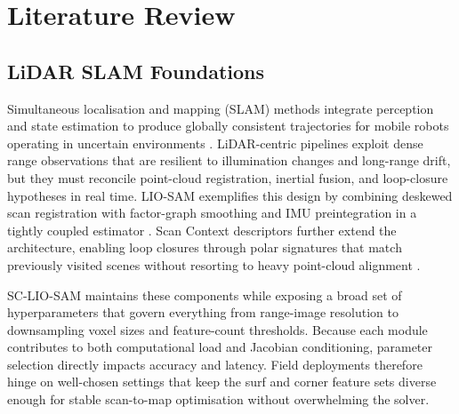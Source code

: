 \chapter[Literature Review]{Literature Review}
\label{Chap:Literature}



\section{LiDAR SLAM Foundations}
Simultaneous localisation and mapping (SLAM) methods integrate perception and state estimation to produce globally consistent trajectories for mobile robots operating in uncertain environments \cite{cadena_2016_past}. LiDAR-centric pipelines exploit dense range observations that are resilient to illumination changes and long-range drift, but they must reconcile point-cloud registration, inertial fusion, and loop-closure hypotheses in real time. LIO-SAM exemplifies this design by combining deskewed scan registration with factor-graph smoothing and IMU preintegration in a tightly coupled estimator \cite{shan_2020_liosam}. Scan Context descriptors further extend the architecture, enabling loop closures through polar signatures that match previously visited scenes without resorting to heavy point-cloud alignment \cite{gkim-2018-iros}.

SC-LIO-SAM maintains these components while exposing a broad set of hyperparameters that govern everything from range-image resolution to downsampling voxel sizes and feature-count thresholds. Because each module contributes to both computational load and Jacobian conditioning, parameter selection directly impacts accuracy and latency. Field deployments therefore hinge on well-chosen settings that keep the surf and corner feature sets diverse enough for stable scan-to-map optimisation without overwhelming the solver.

